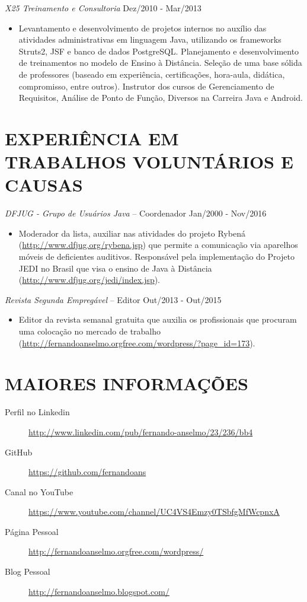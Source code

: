 \documentclass{res}
\begin{document}
\begin{resume}
		{\sl X25 Treinamento e Consultoria} \hfill   Dez/2010 - Mar/2013
		\begin{itemize}
			\item Levantamento e desenvolvimento de projetos internos no auxílio das atividades administrativas em linguagem Java, utilizando os frameworks Struts2, JSF e banco de dados PostgreSQL. Planejamento e desenvolvimento de treinamentos no modelo de Ensino à Distância. Seleção de uma base sólida de professores (baseado em experiência, certificações, hora-aula, didática, compromisso, entre outros). Instrutor dos cursos de Gerenciamento de Requisitos, Análise de Ponto de Função, Diversos na Carreira Java e Android. 
		\end{itemize}
		
		\section{EXPERIÊNCIA EM TRABALHOS VOLUNTÁRIOS E CAUSAS}
		\vspace{8pt} 
		{\sl DFJUG - Grupo de Usuários Java} -- Coordenador \hfill Jan/2000 - Nov/2016
		\begin{itemize}
			\item Moderador da lista, auxiliar nas atividades do projeto Rybená (\url{http://www.dfjug.org/rybena.jsp}) 
			que permite a comunicação via aparelhos móveis de deficientes auditivos. Responsável pela implementação 
			do Projeto JEDI no Brasil que visa o ensino de Java à Distância (\url{http://www.dfjug.org/jedi/index.jsp}).
		\end{itemize}
		
		{\sl Revista Segunda Empregável} -- Editor \hfill   Out/2013 - Out/2015
		\begin{itemize}
			\item Editor da revista semanal gratuita que auxilia os profissionais 
			que procuram uma colocação no mercado de trabalho (\url{http://fernandoanselmo.orgfree.com/wordpress/?page_id=173}).
		\end{itemize}
		
		\section{MAIORES INFORMAÇÕES}
		\vspace{18pt} 
		\begin{description}
			\item[Perfil no Linkedin] \url{http://www.linkedin.com/pub/fernando-anselmo/23/236/bb4}
			\item[GitHub] \url{https://github.com/fernandoans}
			\item[Canal no YouTube] \url{https://www.youtube.com/channel/UC4VS4Emzy0TSbfgMfWcpnxA}
			\item[Página Pessoal] \url{http://fernandoanselmo.orgfree.com/wordpress/}
			\item[Blog Pessoal] \url{http://fernandoanselmo.blogspot.com/}
		\end{description}
	\end{resume} 
\end{document}

